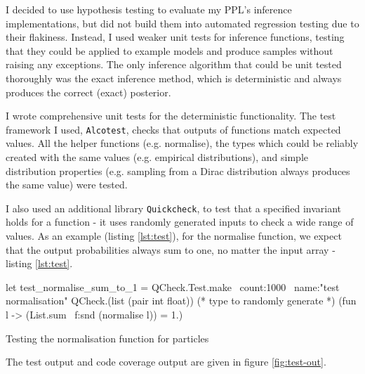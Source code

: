 I decided to use hypothesis testing to evaluate my PPL's inference implementations, but did not build them into automated regression testing due to their flakiness. Instead, I used weaker unit tests for inference functions, testing that they could be applied to example models and produce samples without raising any exceptions. The only inference algorithm that could be unit tested thoroughly was the exact inference method, which is deterministic and always produces the correct (exact) posterior.

I wrote comprehensive unit tests for the deterministic functionality. The test framework I used, \texttt{Alcotest}, checks that outputs of functions match expected values. All the helper functions (e.g. normalise), the types which could be reliably created with the same values (e.g. empirical distributions), and simple distribution properties (e.g. sampling from a Dirac distribution always produces the same value) were tested.

I also used an additional library \texttt{Quickcheck}, to test that a specified invariant holds for a function - it uses randomly generated inputs to check a wide range of values. As an example (listing \ref{lst:test}), for the normalise function, we expect that the output probabilities always sum to one, no matter the input array - listing \ref{lst:test}.
	
\begin{listing}[!htb]
	\centering
	\begin{ocamlcode-in} 
let test_normalise_sum_to_1 =
QCheck.Test.make ~count:1000 ~name:"test normalisation"
QCheck.(list (pair int float)) (* type to randomly generate *)
(fun l -> (List.sum ~f:snd (normalise l)) = 1.)
	\end{ocamlcode-in}
	\caption{Testing the normalisation function for particles}
	\label{lst:test}
\end{listing}
	
The test output and code coverage output are given in figure \ref{fig:test-out}.

